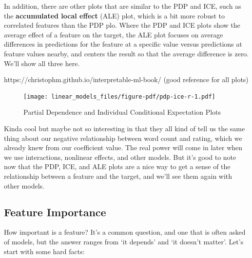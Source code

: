 \documentclass[
  letterpaper,
]{krantz}
\begin{document}
In addition, there are other plots that are similar to the PDP and ICE,
such as the \textbf{accumulated local effect} (ALE) plot, which is a bit
more robust to correlated features than the PDP plo. Where the PDP and
ICE plots show the average effect of a feature on the target, the ALE
plot focuses on average differences in predictions for the feature at a
specific value versus predictions at feature values nearby, and centers
the result so that the average difference is zero. We'll show all three
here.

https://christophm.github.io/interpretable-ml-book/ (good reference for
all plots)

\begin{figure}

{\centering \texttt{[image: linear\_models\_files/figure-pdf/pdp-ice-r-1.pdf]}

}

\caption{Partial Dependence and Individual Conditional Expectation
Plots}

\end{figure}

Kinda cool but maybe not so interesting in that they all kind of tell us
the same thing about our negative relationship between word count and
rating, which we already knew from our coefficient value. The real power
will come in later when we use interactions, nonlinear effects, and
other models. But it's good to note now that the PDP, ICE, and ALE plots
are a nice way to get a sense of the relationship between a feature and
the target, and we'll see them again with other models.

\subsection{Feature Importance}\label{feature-importance}

How important is a feature? It's a common question, and one that is
often asked of models, but the answer ranges from `it depends' and `it
doesn't matter'. Let's start with some hard facts:
\end{document}
